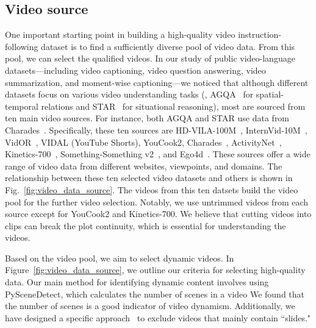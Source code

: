 \subsection{Video source}
\label{sec:dataset;subsec:datasource}
One important starting point in building a high-quality video instruction-following dataset is to find a sufficiently diverse pool of video data. From this pool, we can select the qualified videos. In our study of public video-language datasets---including video captioning, video question answering, video summarization, and moment-wise captioning---we noticed that although different datasets focus on various video understanding tasks (\eg, AGQA~\citep{grunde2021agqa} for spatial-temporal relations and STAR~\citep{wu2024star} for situational reasoning), most are sourced from ten main video sources. For instance, both AGQA and STAR use data from Charades~\citep{sigurdsson2016charades}. Specifically, these ten sources are HD-VILA-100M~\citep{xue2022hdvila}, InternVid-10M~\citep{wang2023internvid}, VidOR~\citep{shang2019vidor}, VIDAL (YouTube Shorts)\citep{zhu2023languagebind}, YouCook2\citep{Zhou2017YouCookIID}, Charades~\citep{sigurdsson2016charades}, ActivityNet~\citep{caba2015activitynet}, Kinetics-700~\citep{kay2017kinetics}, Something-Something v2~\citep{goyal2017something}, and Ego4d~\citep{grauman2022ego4d}. These sources offer a wide range of video data from different websites, viewpoints, and domains. The relationship between these ten selected video datasets and others is shown in Fig.~\ref{fig:video_data_source}. The videos from this ten datsets build the video pool for the further video selection.  Notably, we use untrimmed videos from each source except for YouCook2 and Kinetics-700. We believe that cutting videos into clips can break the plot continuity, which is essential for understanding the videos.

Based on the video pool, we aim to select dynamic videos. In Figure~\ref{fig:video_data_source}, we outline our criteria for selecting high-quality data. Our main method for identifying dynamic content involves using PySceneDetect, which calculates the number of scenes in a video
We found that the number of scenes is a good indicator of video dynamism. Additionally, we have designed a specific approach~ to exclude videos that mainly contain ``slides."

